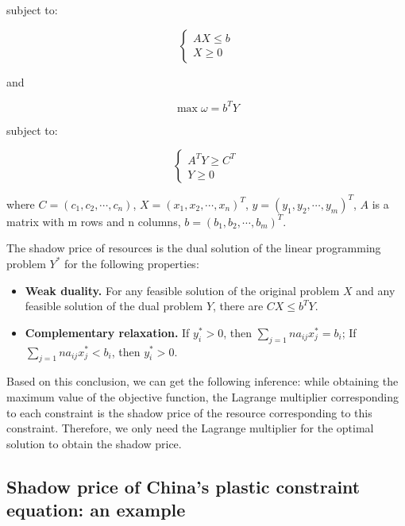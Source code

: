 \documentclass{mcmthesis}
\begin{document}
subject to:

\begin{equation}
\label{d1}
\left\{
\begin{aligned}
AX \le b\\
X \ge 0
\end{aligned}
\right.
\end{equation}

and

\begin{equation}
\max \omega = b^TY
\end{equation}

subject to:

\begin{equation}
\label{d2}
\left\{
\begin{aligned}
A^TY \ge C^T\\
Y \ge 0
\end{aligned}
\right.
\end{equation}

where $C = (c_1,c_2,\cdots,c_n)$, $X = {(x_1,x_2,\cdots,x_n)}^T$, $y = {(y_1,y_2,\cdots,y_m)}^T$, $A$ is a matrix with m rows and n columns, $b = {(b_1,b_2,\cdots,b_m)}^T$.

The shadow price of resources is the dual solution of the linear programming problem $Y^*$ for the following properties:

\begin{itemize}
	\item \textbf{Weak duality.} For any feasible solution of the original problem $X$ and any feasible solution of the dual problem $Y$, there are $CX \le b^TY$.
	\item \textbf{Complementary relaxation.} If $y_i^*>0$, then $\sum_{j=1}{n}a_{ij}x_j^*=b_i$; If $\sum_{j=1}{n}a_{ij}x_j^*<b_i$, then $y_i^*>0$.
\end{itemize}

Based on this conclusion, we can get the following inference: while obtaining the maximum value of the objective function, the Lagrange multiplier\cite{Lagrange} corresponding to each constraint is the shadow price of the resource corresponding to this constraint. Therefore, we only need the Lagrange multiplier for the optimal solution to obtain the shadow price.

\subsection{Shadow price of China's plastic constraint equation: an example}
\end{document}
